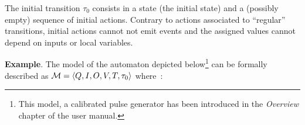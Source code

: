 \medskip The initial transition $\tau_0$ consists in a state (the initial state) and a (possibly
empty) sequence of initial actions. Contrary to actions associated to ``regular'' transitions,
initial actions cannot not emit events and the
assigned values cannot depend on inputs or local variables.
  



\medskip \textbf{Example}. The model of the automaton depicted below\footnote{This model, a
  calibrated pulse generator has been introduced in the \emph{Overview} chapter of the user manual.}
can be formally described as $\mathcal{M}=\langle Q, I, O, V, T, \tau_0\rangle$ where~:

